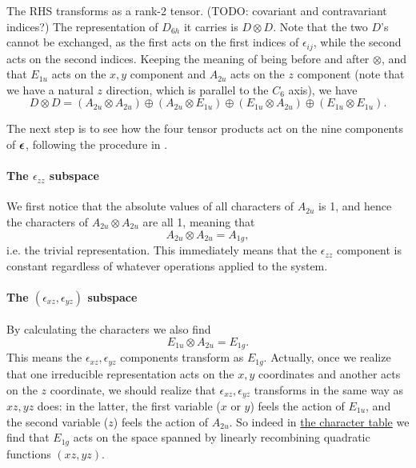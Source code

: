 \documentclass[hyperref, a4paper, 12pt]{article}
\begin{document}
The RHS transforms as a rank-2 tensor. (TODO: covariant and contravariant indices?)
The representation of $D_{6h}$ it carries is $D \otimes D$.
Note that the two $D$'s cannot be exchanged,
as the first acts on the first indices of $\epsilon_{ij}$,
while the second acts on the second indices.
Keeping the meaning of being before and after $\otimes$,
and that $E_{1u}$ acts on the $x, y$ component and $A_{2u}$ acts on the $z$ component
(note that we have a natural $z$ direction,
which is parallel to the $C_6$ axis),
we have 
\begin{equation}
    D \otimes D = (A_{2u} \otimes A_{2u}) \oplus 
    (A_{2u} \otimes E_{1u}) \oplus
    (E_{1u} \otimes A_{2u}) \oplus
    (E_{1u} \otimes E_{1u}).
\end{equation}

The next step is to see how the four tensor products 
act on the nine components of $\vb*{\epsilon}$,
following the procedure in .

\paragraph*{The $\epsilon_{zz}$ subspace}
We first notice that the absolute values of all characters of $A_{2u}$ is 1,
and hence the characters of $A_{2u} \otimes A_{2u}$ are all 1,
meaning that 
\begin{equation}
    A_{2u} \otimes A_{2u} = A_{1g},
\end{equation}
i.e. the trivial representation.
This immediately means that the $\epsilon_{zz}$ component is constant
regardless of whatever operations applied to the system.

\paragraph*{The $(\epsilon_{xz}, \epsilon_{yz})$ subspace}
By calculating the characters we also find 
\begin{equation}
    E_{1u} \otimes A_{2u} = E_{1g}.
\end{equation}
This means the $\epsilon_{xz}, \epsilon_{yz}$ components transform as $E_{1g}$.
Actually, once we realize that one irreducible representation acts on the $x, y$ coordinates
and another acts on the $z$ coordinate,
we should realize that $\epsilon_{xz}, \epsilon_{yz}$
transforms in the same way as $xz, yz$ does:
in the latter, the first variable ($x$ or $y$) feels the action of $E_{1u}$,
and the second variable ($z$) feels the action of $A_{2u}$.
So indeed in \href{http://symmetry.constructor.university/cgi-bin/group.cgi?group=606&option=4}{the character table}
we find that $E_{1g}$ acts on the space spanned by 
linearly recombining quadratic functions $(xz, yz)$.
\end{document}

